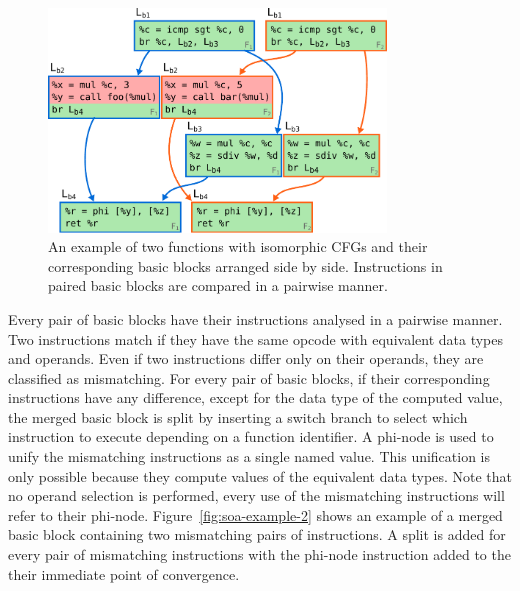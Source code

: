 \begin{figure}[h]
  \centering
  \includegraphics[width=0.8\textwidth]{src/relatedwork/figs/soa-example-1.pdf}
  \caption{An example of two functions with isomorphic CFGs and their corresponding basic blocks arranged side by side. Instructions in paired basic blocks are compared in a pairwise manner.}
  \label{fig:soa-example-1}
\end{figure}

Every pair of basic blocks have their instructions analysed in a pairwise manner.
Two instructions match if they have the same opcode with equivalent data types and operands.
Even if two instructions differ only on their operands, they are classified as mismatching.
For every pair of basic blocks, if their corresponding instructions have any difference, except for the data type of the computed value, the merged basic block is split by inserting a switch branch to select which instruction
to execute depending on a function identifier.
A phi-node is used to unify the mismatching instructions as a single named value.
This unification is only possible because they compute values of the equivalent data types.
Note that no operand selection is performed, every use of the mismatching instructions will refer to their phi-node.
Figure~\ref{fig:soa-example-2} shows an example of a merged basic block containing two mismatching pairs of instructions.
A split is added for every pair of mismatching instructions with the phi-node instruction added to the their immediate point of convergence.


